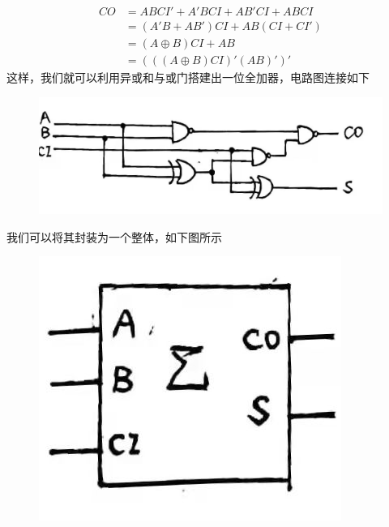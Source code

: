 \documentclass[UTF8]{ctexart}
\begin{document}
{\begin{equation*}
    \begin{aligned}
        CO &= ABCI'+A'BCI+AB'CI+ABCI\\
            &=(A'B+AB')CI+AB(CI+CI')\\
            &=(A\oplus B)CI+AB\\
            &=(((A\oplus B)CI)'(AB)')'
    \end{aligned}
\end{equation*}
这样，我们就可以利用异或和与或门搭建出一位全加器，电路图连接如下
\begin{figure}[H]\begin{center}
    \includegraphics[scale=0.3]{1.jpg}
\end{center}\end{figure}
我们可以将其封装为一个整体，如下图所示
\begin{figure}[H]\begin{center}
    \includegraphics[scale=0.3]{2.jpg}
\end{center}\end{figure}

}
\end{document}
